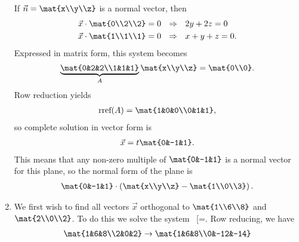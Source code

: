 \begin{exercises}
\begin{problist}
\begin{solution}
\begin{enumerate}
					If $\vec{n} = \mat{x\\y\\z}$ is a normal vector, then
					\begin{align*}
						\vec{x} \cdot \mat{0\\2\\2} &= 0 \ \ \Rightarrow \ \ 2y+2z = 0 \\
						\vec{x} \cdot \mat{1\\1\\1} &= 0 \ \ \Rightarrow \ \ x+y+z = 0.
					\end{align*}
					Expressed in matrix form, this system becomes 
					\begin{align*}
						\underbrace{\mat{0&2&2\\1&1&1}}_{A} \mat{x\\y\\z} = \mat{0\\0}.
					\end{align*}
					Row reduction yields
					\begin{align*}
						\textrm{rref}(A) = \mat{1&0&0\\0&1&1},
					\end{align*}
					so complete solution in vector form is 
					\begin{align*}
						\vec{x} = t\mat{0&-1&1}.
					\end{align*}
					This means that any non-zero multiple of $\mat{0&-1&1}$ is a normal vector for this plane, so the normal form of the plane is 
					\begin{align*}
						\mat{0&-1&1} \cdot \left(\mat{x\\y\\z} - \mat{1\\0\\3} \right).
					\end{align*}
				\item  We first wish to find all vectors $\vec x$ orthogonal to $\mat{1\\6\\8}$ and $\mat{2\\0\\2}$. To do this we solve the system \
					[=.\] Row reducing, we have 
				\begin{align*}
					\mat{1&6&8\\2&0&2}&\rightarrow \mat{1&6&8\\0&-12&-14}\\

\end{align*}
\end{enumerate}
\end{solution}
\end{problist}
\end{exercises}
